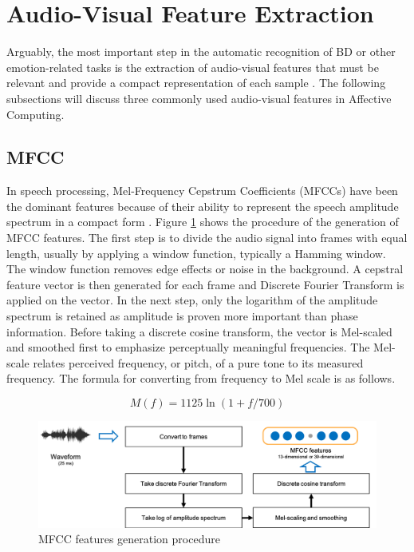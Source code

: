 \section{Audio-Visual Feature Extraction}

Arguably, the most important step in the automatic recognition of BD or other emotion-related tasks is the extraction of audio-visual features that must be relevant and provide a compact representation of each sample \cite{schuller2011}. The following subsections will discuss three commonly used audio-visual features in Affective Computing.



\subsection{MFCC}

In speech processing, Mel-Frequency Cepstrum Coefficients (MFCCs) have been the dominant features because of their ability to represent the speech amplitude spectrum in a compact form \cite{young1993htk}. Figure \ref{fig:mfcc_procedure} shows the procedure of the generation of MFCC features. The first step is to divide the audio signal into frames with equal length, usually by applying a window function, typically a Hamming window. The window function removes edge effects or noise in the background. A cepstral feature vector is then generated for each frame and Discrete Fourier Transform is applied on the vector. In the next step, only the logarithm of the amplitude spectrum is retained as amplitude is proven more important than phase information. Before taking a discrete cosine transform, the vector is Mel-scaled and smoothed first to emphasize perceptually meaningful frequencies. The Mel-scale relates perceived frequency, or pitch, of a pure tone to its measured frequency. The formula for converting from frequency to Mel scale is as follows.

\begin{equation}
    M(f) = 1125 \ln(1+f/700)
\end{equation}


\begin{figure}[htb]
    \centering
    \includegraphics[width=12cm]{images/background/mfcc_procedure.png}
    \caption{MFCC features generation procedure}
    \label{fig:mfcc_procedure}
\end{figure}

